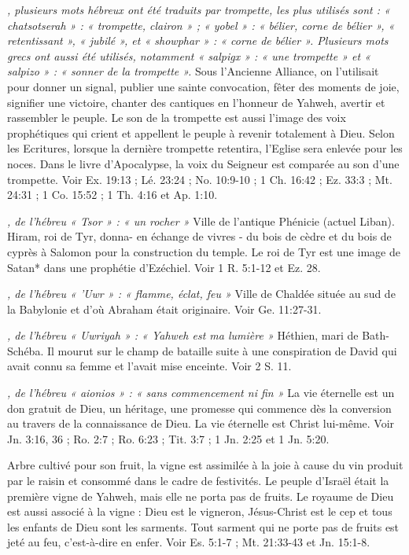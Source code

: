 \begin{multicols}{2}
{\textit{, plusieurs mots hébreux ont été traduits par trompette, les plus utilisés sont : « chatsotserah » : « trompette, clairon » ; « yobel » : « bélier, corne de bélier », « retentissant », « jubilé », et « showphar » : « corne de bélier ». Plusieurs mots grecs ont aussi été utilisés, notamment « salpigx » : « une trompette » et « salpizo » : « sonner de la trompette ».}\newline
Sous l'Ancienne Alliance, on l'utilisait pour donner un signal, publier une sainte convocation, fêter des moments de joie, signifier une victoire, chanter des cantiques en l'honneur de Yahweh, avertir et rassembler le peuple. Le son de la trompette est aussi l'image des voix prophétiques qui crient et appellent le peuple à revenir totalement à Dieu. Selon les Ecritures, lorsque la dernière trompette retentira, l'Eglise sera enlevée pour les noces. Dans le livre d'Apocalypse, la voix du Seigneur est comparée au son d'une trompette. Voir Ex. 19:13 ; Lé. 23:24 ; No. 10:9-10 ; 1 Ch. 16:42 ; Ez. 33:3 ; Mt. 24:31 ; 1 Co. 15:52 ; 1 Th. 4:16 et Ap. 1:10.

\textit{, de l'hébreu « Tsor » : « un rocher »}\newline
Ville de l'antique Phénicie (actuel Liban). Hiram, roi de Tyr, donna- en échange de vivres - du bois de cèdre et du bois de cyprès à Salomon pour la construction du temple. Le roi de Tyr est une image de Satan* dans une prophétie d'Ezéchiel. Voir 1 R. 5:1-12 et Ez. 28.

\textit{, de l'hébreu « 'Uwr » : « flamme, éclat, feu »}\newline
Ville de Chaldée située au sud de la Babylonie et d'où Abraham était originaire. Voir Ge. 11:27-31.

\textit{, de l'hébreu « Uwriyah » : « Yahweh est ma lumière »}\newline
Héthien, mari de Bath-Schéba. Il mourut sur le champ de bataille suite à une conspiration de David qui avait connu sa femme et l'avait mise enceinte. Voir 2 S. 11.

\textit{, de l'hébreu « aionios » : « sans commencement ni fin »}\newline
La vie éternelle est un don gratuit de Dieu, un héritage, une promesse qui commence dès la conversion au travers de la connaissance de Dieu. La vie éternelle est Christ lui-même. Voir Jn. 3:16, 36 ; Ro. 2:7 ; Ro. 6:23 ; Tit. 3:7 ; 1 Jn. 2:25 et 1 Jn. 5:20.

\textit{}\newline
Arbre cultivé pour son fruit, la vigne est assimilée à la joie à cause du vin produit par le raisin et consommé dans le cadre de festivités. Le peuple d'Israël était la première vigne de Yahweh, mais elle ne porta pas de fruits. Le royaume de Dieu est aussi associé à la vigne : Dieu est le vigneron, Jésus-Christ est le cep et tous les enfants de Dieu sont les sarments. Tout sarment qui ne porte pas de fruits est jeté au feu, c'est-à-dire en enfer. Voir Es. 5:1-7 ; Mt. 21:33-43 et Jn. 15:1-8.

}
\end{multicols}
